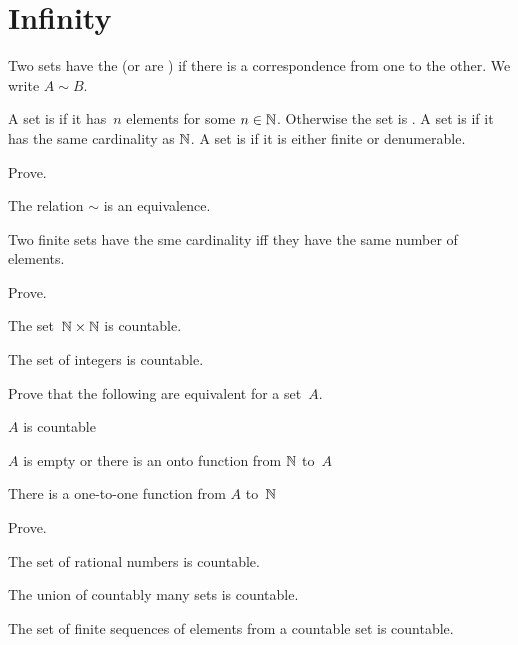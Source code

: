 \documentclass{ibl}
\begin{document}
\chapter{Infinity}

\begin{df}
Two sets have the  
(or are ) if there is a 
correspondence from one to the other.
We write $A\sim B$.   
\end{df}

\begin{df}
A set is  if it has~$n$ elements for some $n\in\mathbb{N}$.
Otherwise the set is .   
A set is  if it has the same cardinality 
as $\mathbb{N}$.
A set is  if it is either finite or denumerable.
\end{df}

\begin{ex} Prove.
\begin{exes}
\item The relation $\sim$ is an equivalence.
\item Two finite sets have the sme cardinality iff they have the
  same number of elements.
\end{exes}
\end{ex}

\begin{ex}  Prove.
\begin{exes}
\item The set~$\mathbb{N}\times\mathbb{N}$ is countable.
\item The set of integers is countable.
\end{exes}
\end{ex}

\begin{ex} Prove that the following are equivalent for a set~$A$.
\begin{exes}
\item $A$ is countable
\item $A$ is empty or there is an onto function from $\mathbb{N}$ to~$A$
\item There is a one-to-one function from $A$ to~$\mathbb{N}$    
\end{exes}
\end{ex}

\begin{ex} Prove.
\begin{exes}
\item The set of rational numbers is countable.
\item The union of countably many sets is countable.
\item The set of finite sequences of elements from a countable set is countable.
\end{exes}
\end{ex}
\end{document}
